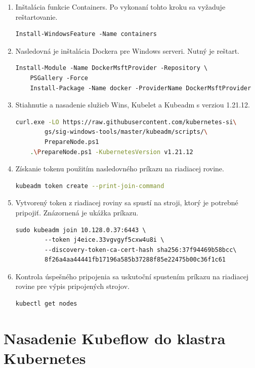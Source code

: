 \begin{enumerate}
\item{\noindent Inštalácia funkcie Containers. Po vykonaní tohto kroku sa vyžaduje reštartovanie.
\begin{lstlisting}[basicstyle=\footnotesize]
    Install-WindowsFeature -Name containers
    \end{lstlisting}}
\item{\noindent Nasledovná je inštalácia Dockera pre Windows serveri. Nutný je reštart.
\begin{lstlisting}[basicstyle=\footnotesize]
    Install-Module -Name DockerMsftProvider -Repository \
    PSGallery -Force
    Install-Package -Name docker -ProviderName DockerMsftProvider
    \end{lstlisting}}
\item{\noindent Stiahnutie a nasadenie služieb Wins, Kubelet a Kubeadm s verziou 1.21.12.
\begin{lstlisting}[language=Bash,basicstyle=\footnotesize]
    curl.exe -LO https://raw.githubusercontent.com/kubernetes-si\
        gs/sig-windows-tools/master/kubeadm/scripts/\
        PrepareNode.ps1
    .\PrepareNode.ps1 -KubernetesVersion v1.21.12
    \end{lstlisting}}
\item{\noindent Získanie tokenu použitím nasledovného príkazu na riadiacej rovine.
\begin{lstlisting}[language=Bash,basicstyle=\footnotesize]
    kubeadm token create --print-join-command
    \end{lstlisting}}
\item{\noindent Vytvorený token z riadiacej roviny sa spustí na stroji, ktorý je potrebné pripojiť. Znázornená je ukážka príkazu.
\begin{lstlisting}[basicstyle=\footnotesize]
    sudo kubeadm join 10.128.0.37:6443 \
        --token j4eice.33vgvgyf5cxw4u8i \
        --discovery-token-ca-cert-hash sha256:37f94469b58bcc\
        8f26a4aa44441fb17196a585b37288f85e22475b00c36f1c61
    \end{lstlisting}}
\item{\noindent Kontrola úspešného pripojenia sa uskutoční spustením príkazu na riadiacej rovine pre výpis pripojených strojov.
\begin{lstlisting}[language=Bash,basicstyle=\footnotesize]
    kubectl get nodes
    \end{lstlisting}}
\end{enumerate}

\section{Nasadenie Kubeflow do klastra Kubernetes}

